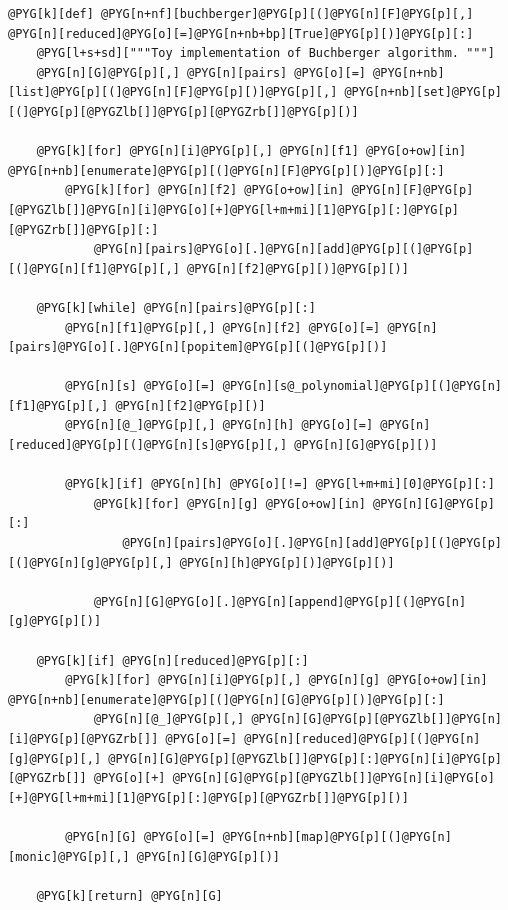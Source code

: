 \begin{Verbatim}[commandchars=@\[\]]
@PYG[k][def] @PYG[n+nf][buchberger]@PYG[p][(]@PYG[n][F]@PYG[p][,] @PYG[n][reduced]@PYG[o][=]@PYG[n+nb+bp][True]@PYG[p][)]@PYG[p][:]
    @PYG[l+s+sd]["""Toy implementation of Buchberger algorithm. """]
    @PYG[n][G]@PYG[p][,] @PYG[n][pairs] @PYG[o][=] @PYG[n+nb][list]@PYG[p][(]@PYG[n][F]@PYG[p][)]@PYG[p][,] @PYG[n+nb][set]@PYG[p][(]@PYG[p][@PYGZlb[]]@PYG[p][@PYGZrb[]]@PYG[p][)]

    @PYG[k][for] @PYG[n][i]@PYG[p][,] @PYG[n][f1] @PYG[o+ow][in] @PYG[n+nb][enumerate]@PYG[p][(]@PYG[n][F]@PYG[p][)]@PYG[p][:]
        @PYG[k][for] @PYG[n][f2] @PYG[o+ow][in] @PYG[n][F]@PYG[p][@PYGZlb[]]@PYG[n][i]@PYG[o][+]@PYG[l+m+mi][1]@PYG[p][:]@PYG[p][@PYGZrb[]]@PYG[p][:]
            @PYG[n][pairs]@PYG[o][.]@PYG[n][add]@PYG[p][(]@PYG[p][(]@PYG[n][f1]@PYG[p][,] @PYG[n][f2]@PYG[p][)]@PYG[p][)]

    @PYG[k][while] @PYG[n][pairs]@PYG[p][:]
        @PYG[n][f1]@PYG[p][,] @PYG[n][f2] @PYG[o][=] @PYG[n][pairs]@PYG[o][.]@PYG[n][popitem]@PYG[p][(]@PYG[p][)]

        @PYG[n][s] @PYG[o][=] @PYG[n][s@_polynomial]@PYG[p][(]@PYG[n][f1]@PYG[p][,] @PYG[n][f2]@PYG[p][)]
        @PYG[n][@_]@PYG[p][,] @PYG[n][h] @PYG[o][=] @PYG[n][reduced]@PYG[p][(]@PYG[n][s]@PYG[p][,] @PYG[n][G]@PYG[p][)]

        @PYG[k][if] @PYG[n][h] @PYG[o][!=] @PYG[l+m+mi][0]@PYG[p][:]
            @PYG[k][for] @PYG[n][g] @PYG[o+ow][in] @PYG[n][G]@PYG[p][:]
                @PYG[n][pairs]@PYG[o][.]@PYG[n][add]@PYG[p][(]@PYG[p][(]@PYG[n][g]@PYG[p][,] @PYG[n][h]@PYG[p][)]@PYG[p][)]

            @PYG[n][G]@PYG[o][.]@PYG[n][append]@PYG[p][(]@PYG[n][g]@PYG[p][)]

    @PYG[k][if] @PYG[n][reduced]@PYG[p][:]
        @PYG[k][for] @PYG[n][i]@PYG[p][,] @PYG[n][g] @PYG[o+ow][in] @PYG[n+nb][enumerate]@PYG[p][(]@PYG[n][G]@PYG[p][)]@PYG[p][:]
            @PYG[n][@_]@PYG[p][,] @PYG[n][G]@PYG[p][@PYGZlb[]]@PYG[n][i]@PYG[p][@PYGZrb[]] @PYG[o][=] @PYG[n][reduced]@PYG[p][(]@PYG[n][g]@PYG[p][,] @PYG[n][G]@PYG[p][@PYGZlb[]]@PYG[p][:]@PYG[n][i]@PYG[p][@PYGZrb[]] @PYG[o][+] @PYG[n][G]@PYG[p][@PYGZlb[]]@PYG[n][i]@PYG[o][+]@PYG[l+m+mi][1]@PYG[p][:]@PYG[p][@PYGZrb[]]@PYG[p][)]

        @PYG[n][G] @PYG[o][=] @PYG[n+nb][map]@PYG[p][(]@PYG[n][monic]@PYG[p][,] @PYG[n][G]@PYG[p][)]

    @PYG[k][return] @PYG[n][G]
\end{Verbatim}
